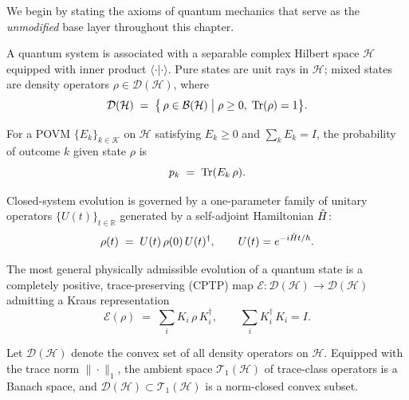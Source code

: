 We begin by stating the axioms of quantum mechanics that serve as the
\emph{unmodified} base layer throughout this chapter.

\begin{axiom}
\label{ax:10.1}
A quantum system is associated with a separable complex Hilbert space
$\mathcal{H}$ equipped with inner product
$\langle\cdot|\cdot\rangle$.  Pure states are unit rays in
$\mathcal{H}$; mixed states are density operators
$\rho\in\mathcal{D}(\mathcal{H})$, where
\[
  \mathcal{D}(\mathcal{H})
  \;=\;
  \bigl\{\,\rho\in\mathcal{B}(\mathcal{H})
         \;\big|\;
         \rho\geq 0,\;\mathrm{Tr}(\rho)=1
  \bigr\}.
\]
\end{axiom}

\begin{axiom}
\label{ax:10.2}
For a POVM $\{E_k\}_{k\in\mathcal{K}}$ on $\mathcal{H}$ satisfying
$E_k\geq 0$ and $\sum_k E_k = I$, the probability of outcome $k$
given state $\rho$ is
\[
  p_k \;=\; \mathrm{Tr}(E_k\,\rho).
\]
\end{axiom}

\begin{axiom}
\label{ax:10.3}
Closed-system evolution is governed by a one-parameter family of
unitary operators $\{U(t)\}_{t\in\mathbb{R}}$ generated by a
self-adjoint Hamiltonian $\hat{H}$:
\[
  \rho(t) \;=\; U(t)\,\rho(0)\,U(t)^{\dagger},
  \qquad
  U(t) = e^{-i\hat{H} t/\hbar}.
\]
\end{axiom}

\begin{axiom}
\label{ax:10.4}
The most general physically admissible evolution of a quantum state is
a completely positive, trace-preserving (CPTP) map
$\mathcal{E}:\mathcal{D}(\mathcal{H})\to\mathcal{D}(\mathcal{H})$
admitting a Kraus representation
\[
  \mathcal{E}(\rho)
  \;=\;
  \sum_{i} K_i\,\rho\,K_i^{\dagger},
  \qquad
  \sum_{i} K_i^{\dagger}\,K_i = I.
\]
\end{axiom}

\begin{definition}
\label{def:10.1}
Let $\mathcal{D}(\mathcal{H})$ denote the convex set of all density
operators on $\mathcal{H}$.  Equipped with the trace norm
$\|\cdot\|_1$, the ambient space
$\mathcal{T}_1(\mathcal{H})$ of trace-class operators is a Banach
space, and $\mathcal{D}(\mathcal{H})\subset\mathcal{T}_1(\mathcal{H})$
is a norm-closed convex subset.
\end{definition}


